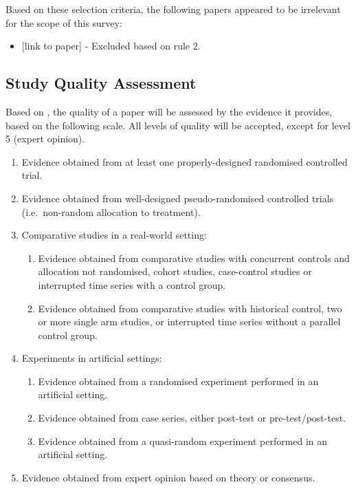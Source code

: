\documentclass[]{book}
\providecommand{\tightlist}{%
  \setlength{\itemsep}{0pt}\setlength{\parskip}{0pt}}
\begin{document}
Based on these selection criteria, the following papers appeared to be
irrelevant for the scope of this survey:

\begin{itemize}
\tightlist
\item
  {[}link to paper{]} - Excluded based on rule 2.
\end{itemize}

\subsection{Study Quality Assessment}\label{study-quality-assessment}

Based on \citet{kitchenham2004procedures}, the quality of a paper will
be assessed by the evidence it provides, based on the following scale.
All levels of quality will be accepted, except for level 5 (expert
opinion).

\begin{enumerate}
\def\labelenumi{\arabic{enumi}.}
\tightlist
\item
  Evidence obtained from at least one properly-designed randomised
  controlled trial.
\item
  Evidence obtained from well-designed pseudo-randomised controlled
  trials (i.e.~non-random allocation to treatment).
\item
  Comparative studies in a real-world setting:

  \begin{enumerate}
  \def\labelenumii{\arabic{enumii}.}
  \tightlist
  \item
    Evidence obtained from comparative studies with concurrent controls
    and allocation not randomised, cohort studies, case-control studies
    or interrupted time series with a control group.
  \item
    Evidence obtained from comparative studies with historical control,
    two or more single arm studies, or interrupted time series without a
    parallel control group.
  \end{enumerate}
\item
  Experiments in artificial settings:

  \begin{enumerate}
  \def\labelenumii{\arabic{enumii}.}
  \tightlist
  \item
    Evidence obtained from a randomised experiment performed in an
    artificial setting.
  \item
    Evidence obtained from case series, either post-test or
    pre-test/post-test.
  \item
    Evidence obtained from a quasi-random experiment performed in an
    artificial setting.
  \end{enumerate}
\item
  Evidence obtained from expert opinion based on theory or consensus.
\end{enumerate}
\end{document}
